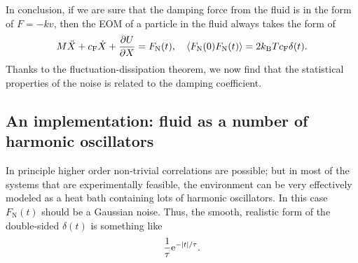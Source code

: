\documentclass[hyperref, a4paper]{article}
\newcommand*{\ee}{\mathrm{e}}
\newcommand*{\kB}{k_{\text{B}}}
\newcommand{\cf}{c_{\text{F}}}
\newcommand{\fn}{F_{\text{N}}}
\begin{document}
In conclusion, if we are sure that the damping force from the fluid 
is in the form of $F = - k v$,
then the EOM of a particle in the fluid always takes the form of 
\begin{equation}
    M \ddot{X} + \cf \dot{X} + \pdv{U}{X} = \fn(t), \quad 
    \expval{\fn(0) \fn(t)} = 2 \kB T \cf \delta(t).
\end{equation} 
Thanks to the fluctuation-dissipation theorem,
we now find that the statistical properties of the noise 
is related to the damping coefficient.

\subsection{An implementation: fluid as a number of harmonic oscillators}

In principle higher order non-trivial correlations are possible; 
but in most of the systems that are experimentally feasible,
the environment can be very effectively modeled as 
a heat bath containing lots of harmonic oscillators.
In this case $\fn(t)$ should be a Gaussian noise.
Thus, the smooth, realistic form of the double-sided $\delta(t)$ is something like 
\begin{equation}
    \frac{1}{\tau} \ee^{- \abs*{t} / \tau}.
\end{equation}
\end{document}
